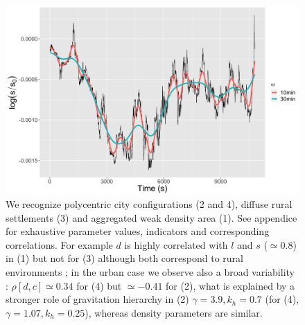 \documentclass{bmcart}
\begin{document}
\begin{figure}[h!]
\includegraphics[width=\linewidth]{figures/Fig1.png}
	\caption{ We recognize polycentric city configurations (2 and 4), diffuse rural settlements (3) and aggregated weak density area (1). See appendice for exhaustive parameter values, indicators and corresponding correlations. For example $d$ is highly correlated with $l$ and $s$ ($\simeq$0.8) in (1) but not for (3) although both correspond to rural environments ; in the urban case we observe also a broad variability : $\rho[d,c]\simeq 0.34$ for (4) but $\simeq-0.41$ for (2), what is explained by a stronger role of gravitation hierarchy in (2) $\gamma=3.9,k_h=0.7$ (for (4), $\gamma=1.07,k_h=0.25$), whereas density parameters are similar.\label{fig:configexamples}}
\end{figure}
\end{document}
